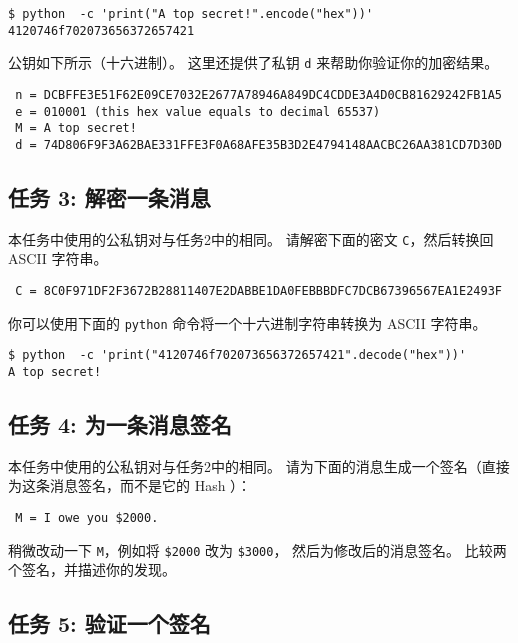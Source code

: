 \begin{lstlisting}
$ python  -c 'print("A top secret!".encode("hex"))'
4120746f702073656372657421
\end{lstlisting}


公钥如下所示（十六进制）。
这里还提供了私钥 \texttt{d} 来帮助你验证你的加密结果。

\begin{lstlisting}
 n = DCBFFE3E51F62E09CE7032E2677A78946A849DC4CDDE3A4D0CB81629242FB1A5
 e = 010001 (this hex value equals to decimal 65537)
 M = A top secret!
 d = 74D806F9F3A62BAE331FFE3F0A68AFE35B3D2E4794148AACBC26AA381CD7D30D
\end{lstlisting}



\subsection{任务 3: 解密一条消息}

本任务中使用的公私钥对与任务2中的相同。
请解密下面的密文 \texttt{C}，然后转换回 ASCII 字符串。

\begin{lstlisting}
 C = 8C0F971DF2F3672B28811407E2DABBE1DA0FEBBBDFC7DCB67396567EA1E2493F
\end{lstlisting}


你可以使用下面的 \texttt{python} 命令将一个十六进制字符串转换为 ASCII 字符串。
\begin{lstlisting}
$ python  -c 'print("4120746f702073656372657421".decode("hex"))'
A top secret!
\end{lstlisting}



\subsection{任务 4: 为一条消息签名}

本任务中使用的公私钥对与任务2中的相同。
请为下面的消息生成一个签名（直接为这条消息签名，而不是它的 Hash ）：

\begin{lstlisting}
 M = I owe you $2000.
\end{lstlisting}

稍微改动一下 \texttt{M}，例如将 \texttt{\$2000} 改为 \texttt{\$3000}，
然后为修改后的消息签名。
比较两个签名，并描述你的发现。


\subsection{任务 5: 验证一个签名}

